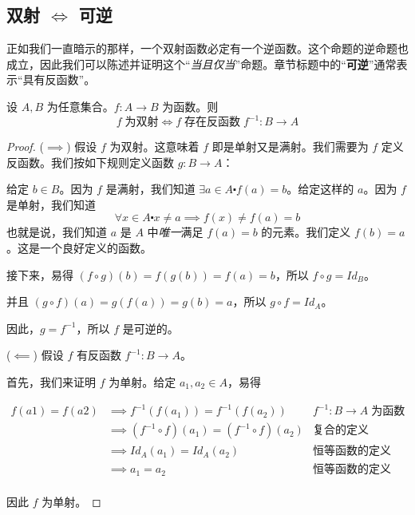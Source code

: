 
\subsection{双射 $\iff$ 可逆}

正如我们一直暗示的那样，一个双射函数必定有一个逆函数。这个命题的逆命题也成立，因此我们可以陈述并证明这个``\emph{当且仅当}''命题。章节标题中的``\textbf{可逆}''通常表示``具有反函数''。

\begin{theorem}
    设 $A, B$ 为任意集合。$f : A \to B$ 为函数。则
    \[f \;\text{为双射} \iff f \;\textbf{存在反函数}\; f^{-1}: B \to A\]
\end{theorem}

\begin{proof}
    ($\implies$) 假设 $f$ 为双射。这意味着 $f$ 即是单射又是满射。我们需要为 $f$ 定义反函数。我们按如下规则定义函数 $g : B \to A$： 

    给定 $b \in B$。因为 $f$ 是满射，我们知道 $\exists a \in A \centerdot f(a)=b$。给定这样的 $a$。因为 $f$ 是单射，我们知道
    \[\forall x \in A \centerdot x \ne a \implies f(x) \ne f(a) = b\]
    也就是说，我们知道 $a$ 是 $A$ 中\emph{唯一}满足 $f(a) = b$ 的元素。我们定义 $f(b) = a$。这是一个良好定义的函数。

    接下来，易得 $(f \circ g)(b) = f(g(b)) = f(a) = b$，所以 $f \circ g = Id_B$。

    并且 $(g \circ f)(a) = g(f(a)) = g(b) = a$，所以 $g \circ f = Id_A$。

    因此，$g = f^{-1}$，所以 $f$ 是可逆的。

    ($\impliedby$) 假设 $f$ 有反函数 $f^{-1} : B \to A$。

    首先，我们来证明 $f$ 为单射。给定 $a_1, a_2 \in A$，易得

    \begin{align*}
        f(a1) = f(a2) &\implies f^{-1}(f(a_1)) = f^{-1}(f(a_2)) & f^{-1}: B \to A \;\text{为函数} \\
        &\implies (f^{-1} \circ f)(a_1) = (f^{-1} \circ f)(a_2) & \text{复合的定义} \\
        &\implies Id_A(a_1) = Id_A(a_2) & \textbf{恒等函数的定义} \\
        &\implies a_1 = a_2 & \textbf{恒等函数的定义} \\
    \end{align*}

    因此 $f$ 为单射。


\end{proof}
